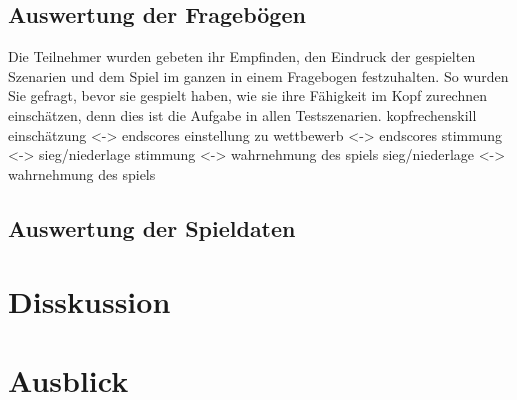 \section{Auswertung der Fragebögen}
Die Teilnehmer wurden gebeten ihr Empfinden, den Eindruck der gespielten Szenarien und dem Spiel im ganzen in einem Fragebogen festzuhalten. So wurden Sie gefragt, bevor sie gespielt haben, wie sie ihre Fähigkeit im Kopf zurechnen einschätzen, denn dies ist die Aufgabe in allen Testszenarien. 
\newline
kopfrechenskill einschätzung <-> endscores
einstellung zu wettbewerb <-> endscores
stimmung <-> sieg/niederlage
stimmung <-> wahrnehmung des spiels
sieg/niederlage <-> wahrnehmung des spiels
\section{Auswertung der Spieldaten}

\chapter{Disskussion}
\chapter{Ausblick}




